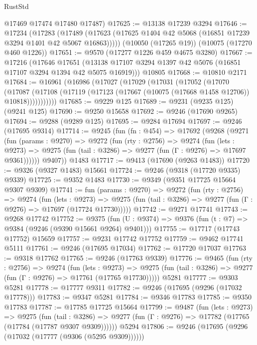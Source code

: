 \begin{lexlean}{RustStd}
\begin{coremodule}
{\begin{coremodule}
{{{{{{{{{{{{{{{{{{{{{{{{{{{{{{{{{      @17469
      @17474
      @17480
      @17487)
@17625 := @13138 @17239 @3294
@17646 := @17234
    (@17283 (@17489 (@17623 (@17625 @1404 @42 @5068 (@16851 @17239 @3294 @1401 @42 @5067 @16863)))))
    (@10050 (@17265 @19))
    (@10075 (@17270 @460 @1226))
@17651 := @9570 (@17277 @1226 @459 @4675 @3280)
@17667 := @17216
    (@17646
      @17651
      (@13138 @17107 @3294 @1397 @42 @5076 (@16851 @17107 @3294 @1394 @42 @5075 @16919)))
    @10805
@17668 := @10810 @2171
@17684 := @16961
    (@16986
      (@17027
        (@17029
          (@17031
            (@17052
              (@17070
                (@17087
                  (@17108 (@17119 (@17123 (@17667 (@10075 (@17668 @1458 @12706)) @10818)))))))))))
@17685 := @9229 @125
@17689 := @9231 (@9235 @125) (@9241 @125)
@17690 := @9250 @15658
@17692 := @9246 (@17690 @9265)
@17694 := @9288 (@9289 @125)
@17695 := @9284 @17694
@17697 := @9246 (@17695 @9314)
@17714 := @9245
    (fun (fn : @454) =>
    @17692
      (@9268
        (@9271
          (fun (params : @9270) =>
          @9272
            (fun (rty : @2756) =>
            @9274
              (fun (lets : @9273) =>
              @9275 (fun (tail : @3286) => @9277 (fun (Γ : @9276) => @17697 @9361))))))
        @9407))
    @1483
@17717 := @9413 (@17690 (@9263 @1483))
@17720 := @9326 (@9327 @1483) @15661
@17724 := @9246 (@9318 (@17720 @9335) @9339)
@17725 := @9352 @1483
@17730 := @9349 (@9351 @17725 @15664 @9307 @9309)
@17741 := fun (params : @9270) =>
  @9272
    (fun (rty : @2756) =>
    @9274
      (fun (lets : @9273) =>
      @9275 (fun (tail : @3286) => @9277 (fun (Γ : @9276) => @17697 (@17724 @17730)))))
@17742 := @9271 @17741
@17743 := @9268 @17742
@17752 := @9375
    (fun (U : @9374) => @9376 (fun (t : @7) => @9384 (@9246 (@9390 @15661 @9264) @9401)))
@17755 := @17717 (@17743 @17752) @15659
@17757 := @9231 @17742 @17752
@17759 := @9462 @17741 @5111
@17761 := @9246 (@17695 @17034)
@17762 := @17720 @17037
@17763 := @9318 @17762
@17765 := @9246 (@17763 @9339)
@17776 := @9465
    (fun (rty : @2756) =>
    @9274
      (fun (lets : @9273) =>
      @9275 (fun (tail : @3286) => @9277 (fun (Γ : @9276) => @17761 (@17765 @17730)))))
    @5281
@17777 := @9303 @5281
@17778 := @17777 @9311
@17782 := @9246 (@17695 (@9296 (@17032 @17778)))
@17783 := @9347 @5281
@17784 := @9346 @17783
@17785 := @9350 @17783
@17787 := @17785 @17725 @15664
@17799 := @9487
    (fun (lets : @9273) =>
    @9275
      (fun (tail : @3286) =>
      @9277 (fun (Γ : @9276) => @17782 (@17765 (@17784 (@17787 @9307 @9309))))))
    @5294
@17806 := @9246 (@17695 (@9296 (@17032 (@17777 (@9306 (@5295 @9309))))))
}}}}}}}}}}}}}}}}}}}}}}}}}}}}}}}}}
\end{coremodule}}
\end{coremodule}
\end{lexlean}
